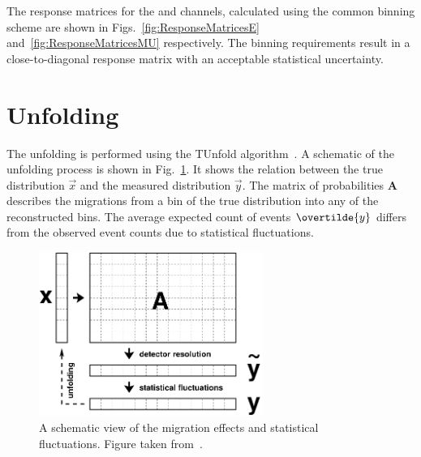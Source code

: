 The response matrices for the \eJets{} and \muJets{} channels, calculated using the common binning scheme are shown in Figs.~\ref{fig:ResponseMatricesE} and~\ref{fig:ResponseMatricesMU} respectively.
The binning requirements result in a close-to-diagonal response matrix with an acceptable statistical uncertainty.




% 
% 

\section{Unfolding} %
\label{sec:unfolding}

The unfolding is performed using the TUnfold algorithm~\cite{Unfold:TUnfold}. 
A schematic of the unfolding process is shown in Fig.~\ref{fig:migration}.
It shows the relation between the true distribution $\vec{x}$ and the measured distribution $\vec{y}$.
The matrix of probabilities $\mathbf{A}$ describes the migrations from a bin of the true distribution into any of the reconstructed bins.
The average expected count of events $\overtilde{y}$ differs from the observed event counts due to statistical fluctuations.
\begin{figure}[htpb]
	\centering
	\includegraphics[width=0.65\textwidth]{Figures/Unfold_TUnfold.png}
	\caption[A schematic view of the migration effects and statistical fluctuations.]{A schematic view of the migration effects and statistical fluctuations. Figure taken from~\cite{Unfold:TUnfold}.}
	\label{fig:migration}
\end{figure}

